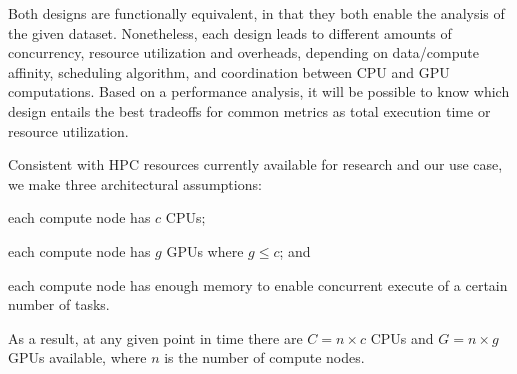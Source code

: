 Both designs are functionally equivalent, in that they both enable the analysis of the given dataset.
Nonetheless, each design leads to different amounts of concurrency, resource utilization and overheads, depending on data/compute affinity, scheduling algorithm, and coordination between CPU and GPU computations.
Based on a performance analysis, it will be possible to know which design entails the best tradeoffs for common metrics as total execution time or resource utilization.

Consistent with HPC resources currently available for research and our use case, we make three architectural assumptions: 
\begin{inparaenum}[(1)]
    \item each compute node has $c$ CPUs;
    \item each compute node has $g$ GPUs where $g \le c$; and
    \item each compute node has enough memory to enable concurrent execute of a certain number of tasks.
\end{inparaenum}
As a result, at any given point in time there are $C = n\times c$ CPUs and $G = n\times g$ GPUs available, where $n$ is the number of compute nodes.

